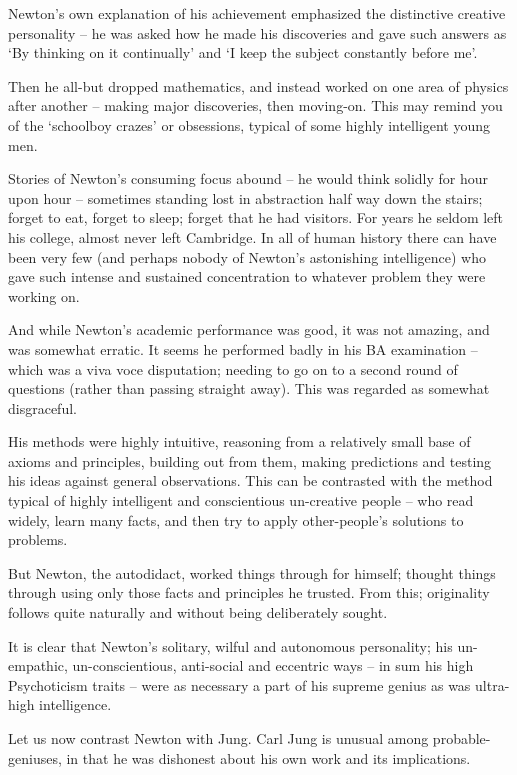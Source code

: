 \documentclass[
]{book}
\begin{document}
Newton's own explanation of his achievement emphasized the distinctive creative personality -- he was asked how he made his discoveries and gave such answers as `By thinking on it continually' and `I keep the subject constantly before me'.

Then he all-but dropped mathematics, and instead worked on one area of physics after another -- making major discoveries, then moving-on. This may remind you of the `schoolboy crazes' or obsessions, typical of some highly intelligent young men.

Stories of Newton's consuming focus abound -- he would think solidly for hour upon hour -- sometimes standing lost in abstraction half way down the stairs; forget to eat, forget to sleep; forget that he had visitors. For years he seldom left his college, almost never left Cambridge. In all of human history there can have been very few (and perhaps nobody of Newton's astonishing intelligence) who gave such intense and sustained concentration to whatever problem they were working on.

And while Newton's academic performance was good, it was not amazing, and was somewhat erratic. It seems he performed badly in his BA examination -- which was a viva voce disputation; needing to go on to a second round of questions (rather than passing straight away). This was regarded as somewhat disgraceful.

His methods were highly intuitive, reasoning from a relatively small base of axioms and principles, building out from them, making predictions and testing his ideas against general observations. This can be contrasted with the method typical of highly intelligent and conscientious un-creative people -- who read widely, learn many facts, and then try to apply other-people's solutions to problems.

But Newton, the autodidact, worked things through for himself; thought things through using only those facts and principles he trusted. From this; originality follows quite naturally and without being deliberately sought.

It is clear that Newton's solitary, wilful and autonomous personality; his un-empathic, un-conscientious, anti-social and eccentric ways -- in sum his high Psychoticism traits -- were as necessary a part of his supreme genius as was ultra-high intelligence.

Let us now contrast Newton with Jung. Carl Jung is unusual among probable-geniuses, in that he was dishonest about his own work and its implications.
\end{document}
